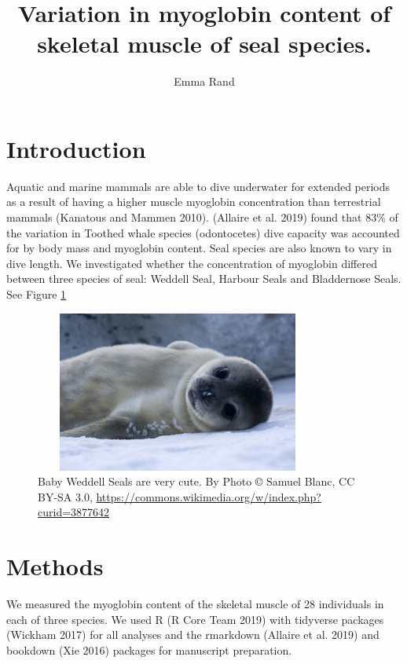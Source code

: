 \documentclass[
]{article}
\title{Variation in myoglobin content of skeletal muscle of seal species.}
\author{Emma Rand}
\date{}
\begin{document}
\maketitle

{
\setcounter{tocdepth}{2}
\tableofcontents
}
\hypertarget{introduction}{%
\section{Introduction}\label{introduction}}

Aquatic and marine mammals are able to dive underwater for extended periods as a result of having a higher muscle myoglobin concentration than terrestrial mammals (Kanatous and Mammen 2010). (Allaire et al. 2019) found that 83\% of the variation in Toothed whale species (odontocetes) dive capacity was accounted for by body mass and myoglobin content.
Seal species are also known to vary in dive length. We investigated whether the concentration of myoglobin differed between three species of seal: Weddell Seal, Harbour Seals and Bladdernose Seals. See Figure \ref{fig:weddell-fig}



\begin{figure}
\includegraphics[width=3.7in,height=200px]{pics/Baby_Weddell_Seal} \caption{Baby Weddell Seals are very cute. By Photo © Samuel Blanc, CC BY-SA 3.0, \url{https://commons.wikimedia.org/w/index.php?curid=3877642}}\label{fig:weddell-fig}
\end{figure}

\hypertarget{methods}{%
\section{Methods}\label{methods}}

We measured the myoglobin content of the skeletal muscle of 28 individuals in each of three species.
We used R (R Core Team 2019) with tidyverse packages (Wickham 2017) for all analyses and the rmarkdown (Allaire et al. 2019) and bookdown (Xie 2016) packages for manuscript preparation.
\end{document}
